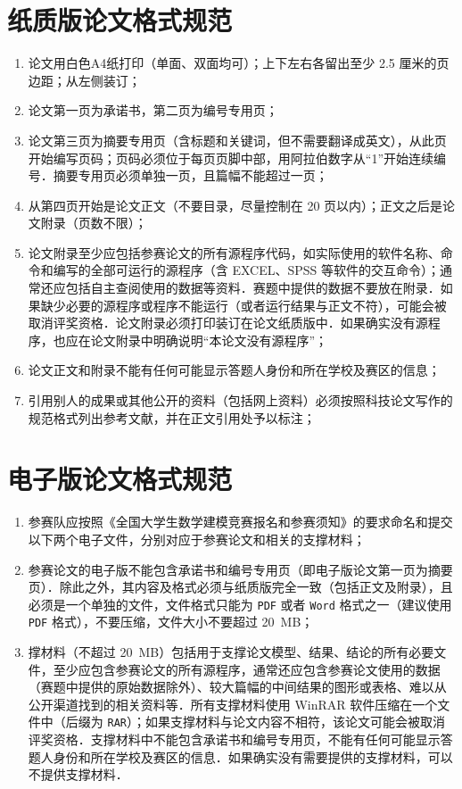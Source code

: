 \documentclass{JXUSTmodeling}
\begin{document}
\section{纸质版论文格式规范}
\begin{enumerate}
  \item 论文用白色A4纸打印（单面、双面均可）；上下左右各留出至少 2.5 厘米的页边距；从左侧装订；
  \item 论文第一页为承诺书，第二页为编号专用页；
  \item 论文第三页为摘要专用页（含标题和关键词，但不需要翻译成英文），从此页开始编写页码；页码必须位于每页页脚中部，用阿拉伯数字从“1”开始连续编号．摘要专用页必须单独一页，且篇幅不能超过一页；
  \item 从第四页开始是论文正文（不要目录，尽量控制在 20 页以内）；正文之后是论文附录（页数不限）；
  \item 论文附录至少应包括参赛论文的所有源程序代码，如实际使用的软件名称、命令和编写的全部可运行的源程序（含 EXCEL、SPSS 等软件的交互命令）；通常还应包括自主查阅使用的数据等资料．赛题中提供的数据不要放在附录．如果缺少必要的源程序或程序不能运行（或者运行结果与正文不符），可能会被取消评奖资格．论文附录必须打印装订在论文纸质版中．如果确实没有源程序，也应在论文附录中明确说明“本论文没有源程序”；
  \item 论文正文和附录不能有任何可能显示答题人身份和所在学校及赛区的信息；
  \item 引用别人的成果或其他公开的资料（包括网上资料）必须按照科技论文写作的规范格式列出参考文献，并在正文引用处予以标注；
\end{enumerate}

\section{电子版论文格式规范}
\begin{enumerate}
  \item 参赛队应按照《全国大学生数学建模竞赛报名和参赛须知》的要求命名和提交以下两个电子文件，分别对应于参赛论文和相关的支撑材料；
  \item 参赛论文的电子版不能包含承诺书和编号专用页（即电子版论文第一页为摘要页）．除此之外，其内容及格式必须与纸质版完全一致（包括正文及附录），且必须是一个单独的文件，文件格式只能为 \texttt{PDF} 或者 \texttt{Word} 格式之一（建议使用 \texttt{PDF} 格式），不要压缩，文件大小不要超过 \SI{20}{MB}；
  \item 撑材料（不超过 \SI{20}{MB}）包括用于支撑论文模型、结果、结论的所有必要文件，至少应包含参赛论文的所有源程序，通常还应包含参赛论文使用的数据（赛题中提供的原始数据除外）、较大篇幅的中间结果的图形或表格、难以从公开渠道找到的相关资料等．所有支撑材料使用 WinRAR 软件压缩在一个文件中（后缀为 \texttt{RAR}）；如果支撑材料与论文内容不相符，该论文可能会被取消评奖资格．支撑材料中不能包含承诺书和编号专用页，不能有任何可能显示答题人身份和所在学校及赛区的信息．如果确实没有需要提供的支撑材料，可以不提供支撑材料．
\end{enumerate}
\end{document}
